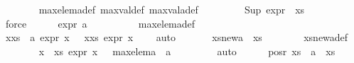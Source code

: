 \begin{isabellebody}
\ \ \ \ \ \ \isamarkupfalse%
\ max{\isacharunderscore}{\kern0pt}elem{\isacharunderscore}{\kern0pt}a{\isacharunderscore}{\kern0pt}def\ max{\isacharunderscore}{\kern0pt}val{\isacharunderscore}{\kern0pt}def\ max{\isacharunderscore}{\kern0pt}val{\isacharunderscore}{\kern0pt}a{\isacharunderscore}{\kern0pt}def\ \isanewline
\ \ \ \ \ \ \isamarkupfalse%
\ {\isacartoucheopen}Sup\ {\isacharparenleft}{\kern0pt}expr{\isacharunderscore}{\kern0pt}{}\ {\isacharbackquote}{\kern0pt}\ xs{\isacharparenright}{\kern0pt}\ {\isacharequal}{\kern0pt}\ {\isasyminfinity}{\isacartoucheclose}\ \isanewline
\ \ \ \ \ \ \isamarkupfalse%
\ force\isanewline
\ \ \ \ \isamarkupfalse%
\ {\isachardoublequoteopen}expr{\isacharunderscore}{\kern0pt}{}\ a\ {\isacharequal}{\kern0pt}\ {\isasyminfinity}{\isachardoublequoteclose}\isanewline
\ \ \ \ \ \ \isamarkupfalse%
\ max{\isacharunderscore}{\kern0pt}elem{\isacharunderscore}{\kern0pt}a{\isacharunderscore}{\kern0pt}def\ \isanewline
\ \ \ \ \ \ \isamarkupfalse%
\ {\isacartoucheopen}{\isasymexists}x{\isasymin}xs\ {\isasymunion}\ {\isacharbraceleft}{\kern0pt}a{\isacharbraceright}{\kern0pt}{\isachardot}{\kern0pt}\ expr{\isacharunderscore}{\kern0pt}{}\ x\ {\isacharequal}{\kern0pt}\ {\isasyminfinity}{\isacartoucheclose}\ {\isacartoucheopen}{\isasymforall}x{\isasymin}xs{\isachardot}{\kern0pt}\ expr{\isacharunderscore}{\kern0pt}{}\ x\ {\isacharless}{\kern0pt}\ {\isasyminfinity}{\isacartoucheclose}\ \isamarkupfalse%
\ auto\ \isanewline
\ \ \ \ \isamarkupfalse%
\ {\isachardoublequoteopen}xs{\isacharunderscore}{\kern0pt}new{\isacharunderscore}{\kern0pt}a\ {\isacharequal}{\kern0pt}\ xs{\isachardoublequoteclose}\isanewline
\ \ \ \ \ \ \isamarkupfalse%
\ xs{\isacharunderscore}{\kern0pt}new{\isacharunderscore}{\kern0pt}a{\isacharunderscore}{\kern0pt}def\isanewline
\ \ \ \ \ \ \isamarkupfalse%
\ {\isacartoucheopen}{\isasymforall}x\ {\isasymin}\ xs{\isachardot}{\kern0pt}\ expr{\isacharunderscore}{\kern0pt}{}\ x\ {\isacharless}{\kern0pt}\ {\isasyminfinity}{\isacartoucheclose}\ {\isacartoucheopen}max{\isacharunderscore}{\kern0pt}elem{\isacharunderscore}{\kern0pt}a\ {\isacharequal}{\kern0pt}\ a{\isacartoucheclose}\ \isanewline
\ \ \ \ \ \ \isamarkupfalse%
\ auto\isanewline
\ \ \ \ \isamarkupfalse%
\ {\isachardoublequoteopen}pos{\isacharunderscore}{\kern0pt}r\ {\isacharparenleft}{\kern0pt}xs\ {\isasymunion}\ {\isacharbraceleft}{\kern0pt}a{\isacharbraceright}{\kern0pt}{\isacharparenright}{\kern0pt}\ {\isacharequal}{\kern0pt}\ xs{\isachardoublequoteclose}\isanewline

\end{isabellebody}
